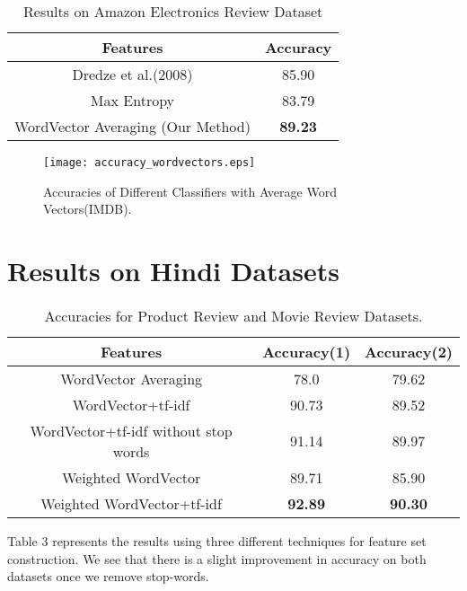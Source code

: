 \begin {table}[h!]
\centering
\begin{tabular}{ | c | c | }
\hline
\textbf{Features} & \textbf{Accuracy} \\ \hline
Dredze et al.(2008) & 85.90\\ \hline
Max Entropy & 83.79\\ \hline
WordVector Averaging (Our Method) & \textbf{89.23}\\ \hline
\end{tabular}
\caption {Results on Amazon Electronics Review Dataset}
\end{table}

\begin{figure}[ht!]
\centering
\texttt{[image: accuracy\_wordvectors.eps]}
\caption{Accuracies of Different Classifiers with Average Word Vectors(IMDB). \label{fig:accuracy_wordvectors}}
\end{figure}

\section{Results on Hindi Datasets}
\label{sec:hindi_results}
\begin {table}[h!]
\centering
\begin{tabular}{ | c | c | c | }
\hline
\textbf{Features} & \textbf{Accuracy(1)} & \textbf{Accuracy(2)} \\ \hline
WordVector Averaging & 78.0 & 79.62\\ \hline
WordVector+tf-idf & 90.73 & 89.52\\ \hline
WordVector+tf-idf without stop words & 91.14 & 89.97\\ \hline
Weighted WordVector & 89.71 & 85.90\\ \hline
Weighted WordVector+tf-idf & \textbf{92.89} & \textbf{90.30}\\ \hline
\end{tabular}
\caption {Accuracies for Product Review and Movie Review Datasets.}
\end{table}

Table 3 represents the results using three different techniques for feature set construction. We see that there is a slight improvement in accuracy on both datasets once we remove stop-words.

